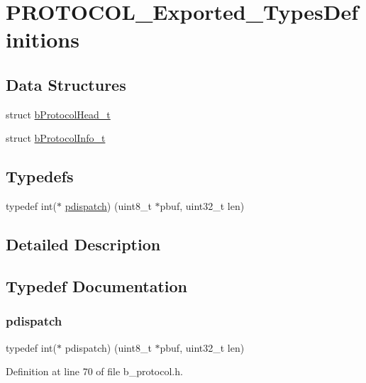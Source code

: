 \hypertarget{group___p_r_o_t_o_c_o_l___exported___types_definitions}{}\section{P\+R\+O\+T\+O\+C\+O\+L\+\_\+\+Exported\+\_\+\+Types\+Definitions}
\label{group___p_r_o_t_o_c_o_l___exported___types_definitions}
\subsection*{Data Structures}
\begin{DoxyCompactItemize}
\item 
struct \mbox{\hyperlink{structb_protocol_head__t}{b\+Protocol\+Head\+\_\+t}}
\item 
struct \mbox{\hyperlink{structb_protocol_info__t}{b\+Protocol\+Info\+\_\+t}}
\end{DoxyCompactItemize}
\subsection*{Typedefs}
\begin{DoxyCompactItemize}
\item 
typedef int($\ast$ \mbox{\hyperlink{group___p_r_o_t_o_c_o_l___exported___types_definitions_ga385520b45d23dc3a4dde23de92b85c75}{pdispatch}}) (uint8\+\_\+t $\ast$pbuf, uint32\+\_\+t len)
\end{DoxyCompactItemize}


\subsection{Detailed Description}


\subsection{Typedef Documentation}
\mbox{\label{group___p_r_o_t_o_c_o_l___exported___types_definitions_ga385520b45d23dc3a4dde23de92b85c75}} 
\subsubsection{\texorpdfstring{pdispatch}{pdispatch}}
{\footnotesize\ttfamily typedef int($\ast$ pdispatch) (uint8\+\_\+t $\ast$pbuf, uint32\+\_\+t len)}



Definition at line 70 of file b\+\_\+protocol.\+h.

